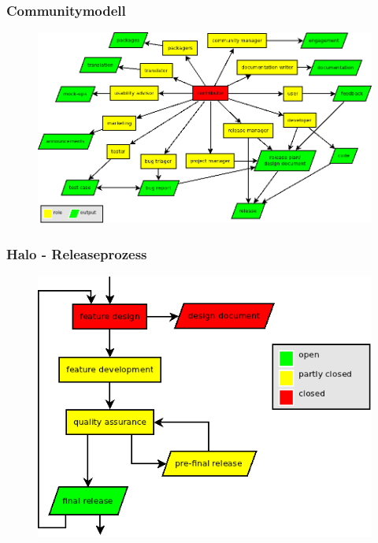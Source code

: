 \documentclass{beamer}
\begin{document}
\begin{frame}
\frametitle{Communitymodell}
\begin{figure}[h!]
 \centering
 \includegraphics[scale=0.35,keepaspectratio=true]{./ontology.png}
\end{figure}
\end{frame}

\begin{frame}
\frametitle{Halo - Releaseprozess}
\begin{figure}[h!]
 \centering
 \includegraphics[scale=0.5,keepaspectratio=true]{./ReleaseProcessHalo.png}
\end{figure}
\end{frame}
\end{document}
